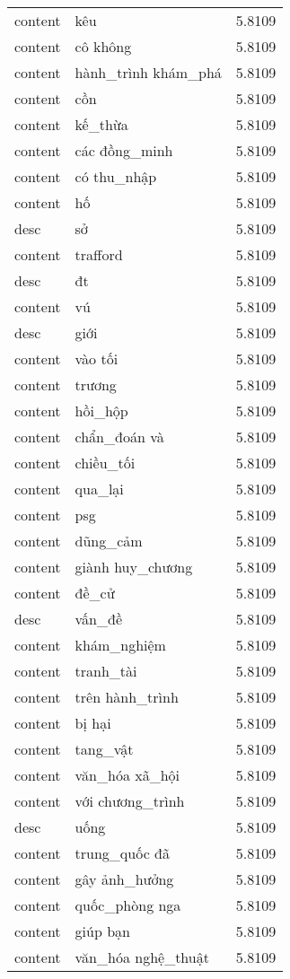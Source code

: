 \documentclass{article}
\begin{document}
\begin{tabular}{lll}
content & kêu & 5.8109\\
content & cô không & 5.8109\\
content & hành\_trình khám\_phá & 5.8109\\
content & cồn & 5.8109\\
content & kế\_thừa & 5.8109\\
content & các đồng\_minh & 5.8109\\
content & có thu\_nhập & 5.8109\\
content & hố & 5.8109\\
desc & sở & 5.8109\\
content & trafford & 5.8109\\
desc & đt & 5.8109\\
content & vú & 5.8109\\
desc & giới & 5.8109\\
content & vào tối & 5.8109\\
content & trương & 5.8109\\
content & hồi\_hộp & 5.8109\\
content & chẩn\_đoán và & 5.8109\\
content & chiều\_tối & 5.8109\\
content & qua\_lại & 5.8109\\
content & psg & 5.8109\\
content & dũng\_cảm & 5.8109\\
content & giành huy\_chương & 5.8109\\
content & đề\_cử & 5.8109\\
desc & vấn\_đề & 5.8109\\
content & khám\_nghiệm & 5.8109\\
content & tranh\_tài & 5.8109\\
content & trên hành\_trình & 5.8109\\
content & bị hại & 5.8109\\
content & tang\_vật & 5.8109\\
content & văn\_hóa xã\_hội & 5.8109\\
content & với chương\_trình & 5.8109\\
desc & uống & 5.8109\\
content & trung\_quốc đã & 5.8109\\
content & gây ảnh\_hưởng & 5.8109\\
content & quốc\_phòng nga & 5.8109\\
content & giúp bạn & 5.8109\\
content & văn\_hóa nghệ\_thuật & 5.8109\\

\end{tabular}
\end{document}
